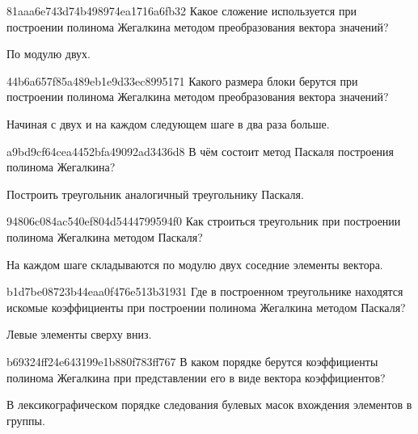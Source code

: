 \begin{note}{81aaa6e743d74b498974ea1716a6fb32}
    Какое сложение используется при построении полинома Жегалкина методом преобразования вектора значений?

    \begin{cloze}{1}
        По модулю двух.
    \end{cloze}
\end{note}

\begin{note}{44b6a657f85a489eb1e9d33ec8995171}
    Какого размера блоки берутся при построении полинома Жегалкина методом преобразования вектора значений?

    \begin{cloze}{1}
        Начиная с двух и на каждом следующем шаге в два раза больше.
    \end{cloze}
\end{note}

\begin{note}{a9bd9cf64cea4452bfa49092ad3436d8}
    В чём состоит метод Паскаля построения полинома Жегалкина?

    \begin{cloze}{1}
        Построить треугольник аналогичный треугольнику Паскаля.
    \end{cloze}
\end{note}

\begin{note}{94806c084ac540ef804d5444799594f0}
    Как строиться треугольник при построении полинома Жегалкина методом Паскаля?

    \begin{cloze}{1}
        На каждом шаге складываются по модулю двух соседние элементы вектора.
    \end{cloze}
\end{note}

\begin{note}{b1d7be08723b44eaa0f476e513b31931}
    Где в построенном треугольнике находятся искомые коэффициенты при построении полинома Жегалкина методом Паскаля?

    \begin{cloze}{1}
        Левые элементы сверху вниз.
    \end{cloze}
\end{note}

\begin{note}{b69324ff24e643199e1b880f783ff767}
    В каком порядке берутся коэффициенты полинома Жегалкина при представлении его в виде вектора коэффициентов?

    \begin{cloze}{1}
        В лексикографическом порядке следования булевых масок вхождения элементов в группы.
    \end{cloze}
\end{note}

